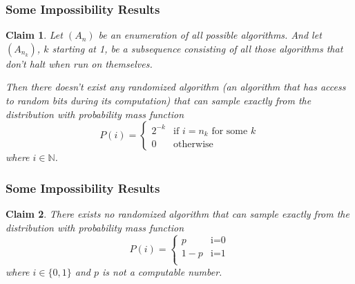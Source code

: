 \documentclass{beamer}
\newtheorem{claim}{Claim}
\begin{document}
\begin{frame}
\frametitle{Some Impossibility Results}
\begin{claim}
	Let $(A_n)$ be an enumeration of all possible algorithms. And let $(A_{n_k})$, $k$ starting at 1, be a subsequence consisting of all those algorithms that don't halt when run on themselves.
	
	Then there doesn't exist any randomized algorithm (an algorithm that has access to random bits during its computation) that can sample exactly from the distribution with probability mass function 
	\[
	P(i) = 
	\begin{cases}
	2^{-k} & \text{if $i=n_k$ for some $k$}\\
	0 & \text{otherwise}
	\end{cases}
	\]
	where $i\in\mathbb{N}$.
\end{claim}
\end{frame}

\begin{frame}
\frametitle{Some Impossibility Results}
\begin{claim}
	There exists no randomized algorithm that can sample exactly from the distribution with probability mass function
	\[
	P(i)=
	\begin{cases}
	p & \text{i=0}\\
	1-p & \text{i=1}\\

	\end{cases}
	\]
	where $i\in\{0,1\}$ and $p$ is not a computable number.
\end{claim}
\end{frame}
 
\end{document}
